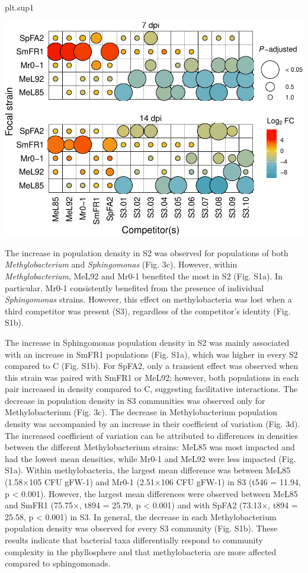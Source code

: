 \documentclass[
]{article}
\newenvironment{Shaded}{\begin{snugshade}}{\end{snugshade}}
\newcommand{\NormalTok}[1]{#1}
\begin{document}
\begin{Shaded}
\begin{Highlighting}[]
\NormalTok{plt.sup1}
\end{Highlighting}
\end{Shaded}

\includegraphics{results1_bacdensity_communitycomplexity_files/figure-latex/plot sup1-1.pdf}

The increase in population density in S2 was observed for populations of
both \emph{Methylobacterium} and \emph{Sphingomonas} (Fig. 3c). However,
within \emph{Methylobacterium}, MeL92 and Mr0-1 benefited the most in S2
(Fig. S1a). In particular, Mr0-1 consistently benefited from the
presence of individual \emph{Sphingomonas} strains. However, this effect
on methylobacteria was lost when a third competitor was present (S3),
regardless of the competitor's identity (Fig. S1b).

The increase in Sphingomonas population density in S2 was mainly
associated with an increase in SmFR1 populations (Fig. S1a), which was
higher in every S2 compared to C (Fig. S1b). For SpFA2, only a transient
effect was observed when this strain was paired with SmFR1 or MeL92;
however, both populations in each pair increased in density compared to
C, suggesting facilitative interactions. The decrease in population
density in S3 communities was observed only for Methylobacterium (Fig.
3c). The decrease in Methylobacterium population density was accompanied
by an increase in their coefficient of variation (Fig. 3d). The
increased coefficient of variation can be attributed to differences in
densities between the different Methylobacterium strains: MeL85 was most
impacted and had the lowest mean densities, while Mr0-1 and MeL92 were
less impacted (Fig. S1a). Within methylobacteria, the largest mean
difference was between MeL85 (1.58×105 CFU gFW-1) and Mr0-1 (2.51×106
CFU gFW-1) in S3 (t546 = 11.94, p \textless{} 0.001). However, the
largest mean differences were observed between MeL85 and SmFR1 (75.75×,
t894 = 25.79, p \textless{} 0.001) and with SpFA2 (73.13×, t894 = 25.58,
p \textless{} 0.001) in S3. In general, the decrease in each
Methylobacterium population density was observed for every S3 community
(Fig. S1b). These results indicate that bacterial taxa differentially
respond to community complexity in the phyllosphere and that
methylobacteria are more affected compared to sphingomonads.
\end{document}
